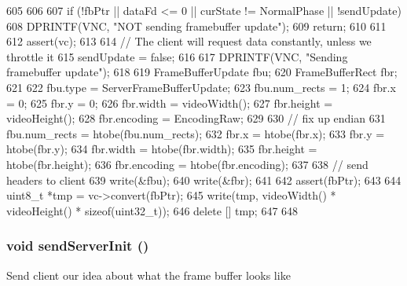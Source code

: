 \begin{DoxyCode}
605 {
606 
607     if (!fbPtr || dataFd <= 0 || curState != NormalPhase || !sendUpdate) {
608         DPRINTF(VNC, "NOT sending framebuffer update\n");
609         return;
610     }
611 
612     assert(vc);
613 
614     // The client will request data constantly, unless we throttle it
615     sendUpdate = false;
616 
617     DPRINTF(VNC, "Sending framebuffer update\n");
618 
619     FrameBufferUpdate fbu;
620     FrameBufferRect fbr;
621 
622     fbu.type = ServerFrameBufferUpdate;
623     fbu.num_rects = 1;
624     fbr.x = 0;
625     fbr.y = 0;
626     fbr.width = videoWidth();
627     fbr.height = videoHeight();
628     fbr.encoding = EncodingRaw;
629 
630     // fix up endian
631     fbu.num_rects = htobe(fbu.num_rects);
632     fbr.x = htobe(fbr.x);
633     fbr.y = htobe(fbr.y);
634     fbr.width = htobe(fbr.width);
635     fbr.height = htobe(fbr.height);
636     fbr.encoding = htobe(fbr.encoding);
637 
638     // send headers to client
639     write(&fbu);
640     write(&fbr);
641 
642     assert(fbPtr);
643 
644     uint8_t *tmp = vc->convert(fbPtr);
645     write(tmp, videoWidth() * videoHeight() * sizeof(uint32_t));
646     delete [] tmp;
647 
648 }
\end{DoxyCode}
\hypertarget{classVncServer_a0d7d773b4b3948da49ae2ecd00f985d5}{
\subsubsection[{sendServerInit}]{\setlength{\rightskip}{0pt plus 5cm}void sendServerInit ()}}
\label{classVncServer_a0d7d773b4b3948da49ae2ecd00f985d5}
Send client our idea about what the frame buffer looks like 


